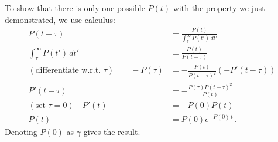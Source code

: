 To show that there is only one possible $P(t)$ with the property we just demonstrated, we use calculus:
\begin{align*}
P(t - \tau) &= \frac{P(t)}{\int_\tau^\infty P(t') \, dt'} \\
\int_\tau^\infty P(t') \, dt' &= \frac{P(t)}{P(t - \tau)} \\
(\text{differentiate w.r.t. }\tau) \qquad -P(\tau) &= -\frac{P(t)}{P(t - \tau)^2}
\left( - P'(t-\tau) \right) \\
P'(t - \tau) &= - \frac{P(\tau)P(t - \tau)^2}{P(t)} \\
(\text{set }\tau=0) \quad P'(t) &= - P(0)P(t) \\
P(t) &= P(0) e^{-P(0) \, t} \, .
\end{align*}
Denoting $P(0)$ as $\gamma$ gives the result.
